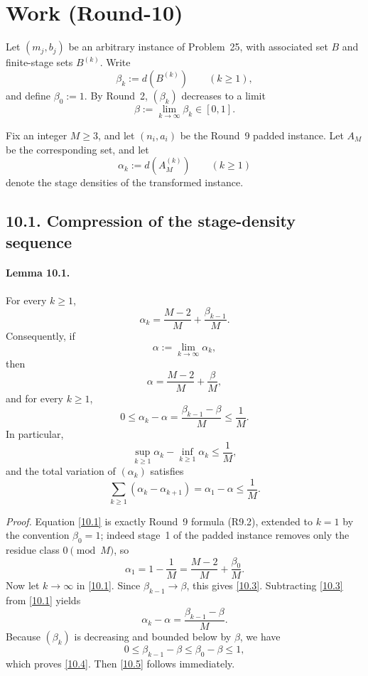 \section{Work (Round-10)}
Let $(m_j,b_j)$ be an arbitrary instance of Problem~25, with associated set $B$ and finite-stage sets $B^{(k)}$.  Write
\[
\beta_k:=d(B^{(k)})\qquad (k\ge 1),
\]
and define $\beta_0:=1$.  By Round~2, $(\beta_k)$ decreases to a limit
\[
\beta:=\lim_{k\to\infty}\beta_k\in[0,1].
\]

Fix an integer $M\ge 3$, and let $(n_i,a_i)$ be the Round~9 padded instance.  Let $A_M$ be the corresponding set, and let
\[
\alpha_k:=d(A_M^{(k)})\qquad (k\ge 1)
\]
denote the stage densities of the transformed instance.

\subsection*{10.1. Compression of the stage-density sequence}
\paragraph{Lemma 10.1.}
For every $k\ge 1$,
\begin{equation}
\alpha_k=\frac{M-2}{M}+\frac{\beta_{k-1}}{M}.
\tag{10.1}
\end{equation}
Consequently, if
\begin{equation}
\alpha:=\lim_{k\to\infty}\alpha_k,
\tag{10.2}
\end{equation}
then
\begin{equation}
\alpha=\frac{M-2}{M}+\frac{\beta}{M},
\tag{10.3}
\end{equation}
and for every $k\ge 1$,
\begin{equation}
0\le \alpha_k-\alpha=\frac{\beta_{k-1}-\beta}{M}\le \frac1M.
\tag{10.4}
\end{equation}
In particular,
\begin{equation}
\sup_{k\ge 1}\alpha_k-\inf_{k\ge 1}\alpha_k\le \frac1M,
\tag{10.5}
\end{equation}
and the total variation of $(\alpha_k)$ satisfies
\begin{equation}
\sum_{k\ge 1}(\alpha_k-\alpha_{k+1})=\alpha_1-\alpha\le \frac1M.
\tag{10.6}
\end{equation}

\emph{Proof.}
Equation \eqref{10.1} is exactly Round~9 formula (R9.2), extended to $k=1$ by the convention $\beta_0=1$; indeed stage~1 of the padded instance removes only the residue class $0\pmod M$, so
\[
\alpha_1=1-\frac1M=\frac{M-2}{M}+\frac{\beta_0}{M}.
\]
Now let $k\to\infty$ in \eqref{10.1}.  Since $\beta_{k-1}\to\beta$, this gives \eqref{10.3}.  Subtracting \eqref{10.3} from \eqref{10.1} yields
\[
\alpha_k-\alpha=\frac{\beta_{k-1}-\beta}{M}.
\]
Because $(\beta_k)$ is decreasing and bounded below by $\beta$, we have
\[
0\le \beta_{k-1}-\beta\le \beta_0-\beta\le 1,
\]
which proves \eqref{10.4}.  Then \eqref{10.5} follows immediately.

